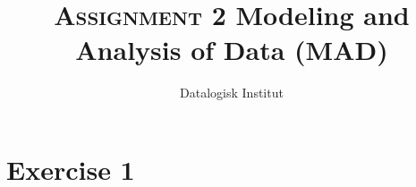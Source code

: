 

\title{
    \vspace{5cm}
    \Huge{\textsc{Assignment 2}}
    \linebreak
    \Large{Modeling and Analysis of Data (MAD)}
}
\author{Datalogisk Institut}

\lstset{language=Python}




\section*{Exercise 1}



